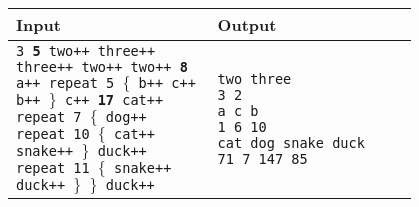 \begin{table}[h]
    \centering
    \begin{tabular}{|p{0.4\linewidth}|p{0.4\linewidth}|}
        \hline
        Input & Output \\ \hline
        \texttt{3\newline
        \textbf{5}\newline
        two++\newline
        three++\newline
        three++\newline
        two++\newline
        two++\newline
        \textbf{8}\newline
        a++\newline
        repeat 5\newline
        $\lbrace$\newline
        b++\newline
        c++\newline
        b++\newline
        $\rbrace$\newline
        c++\newline
        \textbf{17}\newline
        cat++\newline
        repeat 7\newline
        $\lbrace$\newline
        dog++\newline
        repeat 10\newline
        $\lbrace$\newline
        cat++\newline
        snake++\newline
        $\rbrace$\newline
        duck++\newline
        repeat 11\newline
        $\lbrace$\newline
        snake++\newline
        duck++\newline
        $\rbrace$\newline
        $\rbrace$\newline
        duck++}
        & 
        \texttt{two three\newline
        3 2\newline
        a c b\newline
        1 6 10\newline
        cat dog snake duck\newline
        71 7 147 85\newline
        }\\ \hline
    \end{tabular}
\end{table}

